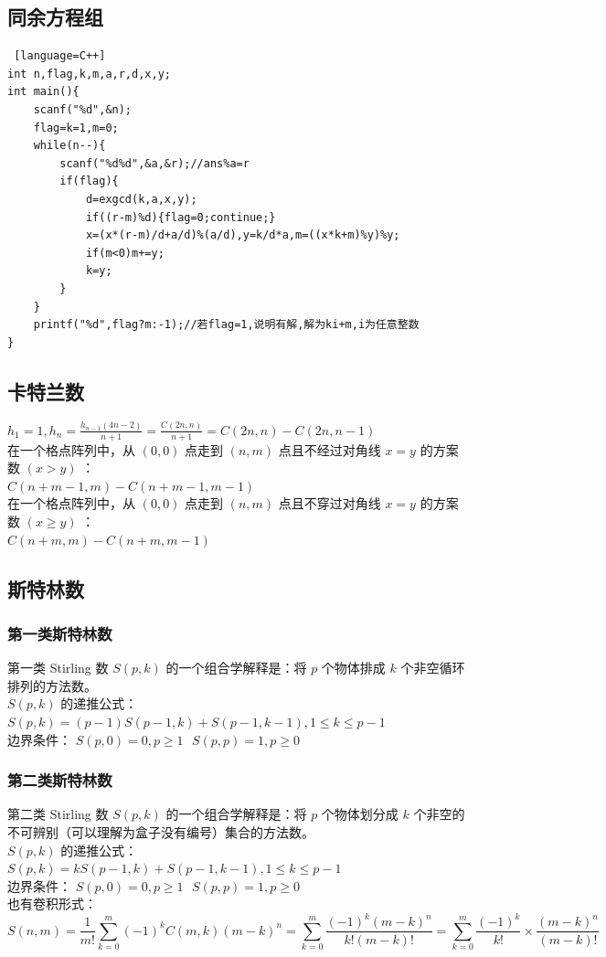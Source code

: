 \documentclass{article}
\begin{document}
\begin{CJK}{UTF8}{song}
\subsection{同余方程组}
\begin{lstlisting} [language=C++]
int n,flag,k,m,a,r,d,x,y;
int main(){
	scanf("%d",&n);
	flag=k=1,m=0;
	while(n--){
		scanf("%d%d",&a,&r);//ans%a=r
		if(flag){
			d=exgcd(k,a,x,y);
			if((r-m)%d){flag=0;continue;}
			x=(x*(r-m)/d+a/d)%(a/d),y=k/d*a,m=((x*k+m)%y)%y;
			if(m<0)m+=y;
			k=y;
		}
	}
	printf("%d",flag?m:-1);//若flag=1,说明有解,解为ki+m,i为任意整数
}
\end{lstlisting}
\subsection{卡特兰数}
$h_1 = 1, h_n = \frac{h_{n-1}(4n-2)}{n+1} = \frac{C(2n, n)}{n+1} = C(2n, n) - C(2n, n-1)$ \\
在一个格点阵列中，从 $(0, 0)$ 点走到 $(n, m)$ 点且不经过对角线 $x = y$ 的方案数 $(x > y)$ ： \\  $C(n+m-1, m) - C(n+m-1, m-1)$ \\
在一个格点阵列中，从 $(0, 0)$ 点走到 $(n, m)$ 点且不穿过对角线 $x = y$ 的方案数 $(x \geq y)$ ： \\ $C(n+m, m) - C(n+m, m-1)$ 
\subsection{斯特林数}
\subsubsection{第一类斯特林数}
第一类 Stirling 数 $S(p, k)$ 的一个组合学解释是：将 $p$ 个物体排成 $k$ 个非空循环排列的方法数。 \\
$S(p, k)$ 的递推公式： $S(p, k) = (p-1) S(p-1, k) + S(p-1, k-1), 1 \leq k \leq p-1$ \\
边界条件： $S(p, 0) = 0, p \geq 1 \text{    } S(p, p) = 1, p \geq 0$
\subsubsection{第二类斯特林数}
第二类 Stirling 数 $S(p, k)$ 的一个组合学解释是：将 $p$ 个物体划分成 $k$ 个非空的不可辨别（可以理解为盒子没有编号）集合的方法数。\\
$S(p, k)$ 的递推公式： $S(p, k) = k S(p-1, k) + S(p-1, k-1), 1 \leq k \leq p-1$ \\
边界条件： $S(p, 0) = 0, p \geq 1 \text{    } S(p, p) = 1, p \geq 0$\\
也有卷积形式： \\
$$S(n, m) = \frac{1}{m!} \sum\limits_{k=0}^{m}(-1)^kC(m,k)(m-k)^n = \sum\limits_{k=0}^{m} \frac{(-1)^k(m-k)^n}{k!(m-k)!} = \sum\limits_{k=0}^{m}\frac{(-1)^k}{k!} \times \frac{(m-k)^n}{(m-k)!}$$

\end{CJK}
\end{document}
